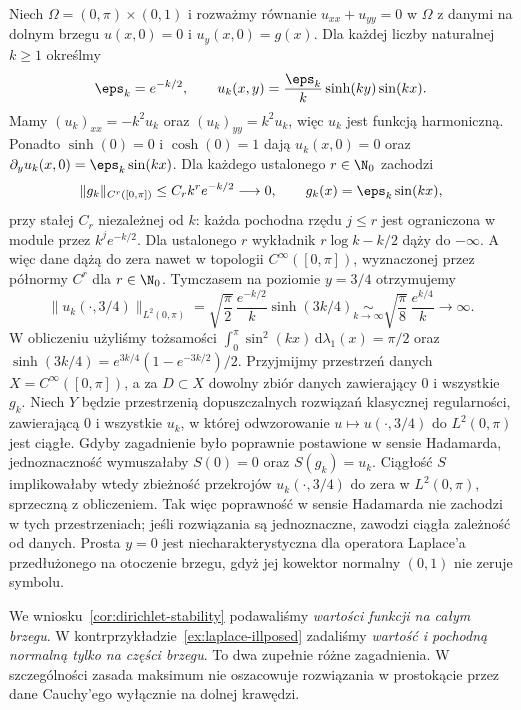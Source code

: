 \begin{kontrprzyklad}
\label{ex:laplace-illposed}
Niech $\Omega=(0,\pi)\times(0,1)$ i rozważmy równanie
$u_{xx}+u_{yy}=0$ w $\Omega$ z danymi na dolnym brzegu
$u(x,0)=0$ i $u_y(x,0)=g(x)$.
Dla każdej liczby naturalnej $k\geq1$ określmy
\begin{equation}\label{eq:hadamard-counterexample}
 \eps_k=e^{-k/2},\qquad
 u_k(x,y)=\frac{\eps_k}{k}\sinh(ky)\sin(kx).
\end{equation}
Mamy $(u_k)_{xx}=-k^2u_k$ oraz $(u_k)_{yy}=k^2u_k$,
więc $u_k$ jest funkcją harmoniczną. Ponadto $\sinh(0)=0$ i
$\cosh(0)=1$ dają $u_k(x,0)=0$ oraz
$\partial_yu_k(x,0)=\eps_k\sin(kx)$.
Dla każdego ustalonego $r\in\N_0$ zachodzi
\[
 \|g_k\|_{C^r([0,\pi])}\leq C_r k^r e^{-k/2}\longrightarrow0,
 \qquad g_k(x)=\eps_k\sin(kx),
\]
przy stałej $C_r$ niezależnej od $k$: każda pochodna rzędu
$j\leq r$ jest ograniczona w module przez $k^j e^{-k/2}$.
Dla ustalonego $r$ wykładnik $r\log k-k/2$ dąży do $-\infty$.
A więc dane dążą do zera nawet w topologii $C^\infty([0,\pi])$,
wyznaczonej przez półnormy $C^r$ dla $r\in\N_0$.
Tymczasem na poziomie $y=3/4$ otrzymujemy
\[
 \|u_k(\cdot,3/4)\|_{L^2(0,\pi)}
 =\sqrt{\frac\pi2}\,\frac{e^{-k/2}}{k}\sinh(3k/4)
 \underset{k\to\infty}{\sim}
 \sqrt{\frac\pi8}\,\frac{e^{k/4}}{k}
 \longrightarrow\infty.
\]
W obliczeniu użyliśmy tożsamości
$\int_0^\pi\sin^2(kx)\,\mathrm d\lambda_1(x)=\pi/2$
oraz $\sinh(3k/4)=e^{3k/4}(1-e^{-3k/2})/2$.
Przyjmijmy przestrzeń danych $X=C^\infty([0,\pi])$,
a za $D\subset X$ dowolny zbiór danych zawierający $0$ i wszystkie $g_k$.
Niech $Y$ będzie przestrzenią dopuszczalnych rozwiązań klasycznej
regularności, zawierającą $0$ i wszystkie $u_k$, w której
odwzorowanie $u\mapsto u(\cdot,3/4)$ do $L^2(0,\pi)$ jest ciągłe.
Gdyby zagadnienie było poprawnie postawione w sensie Hadamarda,
jednoznaczność wymuszałaby $S(0)=0$ oraz $S(g_k)=u_k$.
Ciągłość $S$ implikowałaby wtedy zbieżność przekrojów
$u_k(\cdot,3/4)$ do zera w $L^2(0,\pi)$, sprzeczną z obliczeniem.
Tak więc poprawność w sensie Hadamarda nie zachodzi w tych
przestrzeniach; jeśli rozwiązania są jednoznaczne, zawodzi
ciągła zależność od danych. Prosta $y=0$ jest niecharakterystyczna
dla operatora Laplace'a przedłużonego na otoczenie brzegu,
gdyż jej kowektor normalny $(0,1)$ nie zeruje symbolu.
\end{kontrprzyklad}

\begin{uwaga}
We wniosku~\ref{cor:dirichlet-stability} podawaliśmy
\emph{wartości funkcji na całym brzegu}.
W kontrprzykładzie~\ref{ex:laplace-illposed} zadaliśmy
\emph{wartość i pochodną normalną tylko na części brzegu}.
To dwa zupełnie różne zagadnienia. W szczególności
zasada maksimum nie oszacowuje rozwiązania w prostokącie
przez dane Cauchy'ego wyłącznie na dolnej krawędzi.
\end{uwaga}

